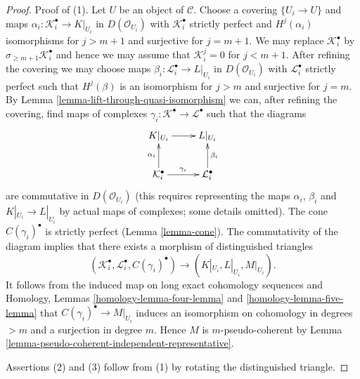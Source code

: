 \documentclass[10pt,a4paper]{amsart}
\theoremstyle{plain}
\theoremstyle{definition}
\theoremstyle{remark}
\numberwithin{equation}{subsection}
\begin{document}
\begin{proof}
Proof of (1). Let $U$ be an object of $\mathcal{C}$. Choose a covering
$\{U_i \to U\}$ and maps $\alpha_i : \mathcal{K}_i^\bullet \to K|_{U_i}$
in $D(\mathcal{O}_{U_i})$ with $\mathcal{K}_i^\bullet$ strictly perfect and
$H^j(\alpha_i)$ isomorphisms for $j > m + 1$ and surjective for $j = m + 1$.
We may replace $\mathcal{K}_i^\bullet$ by
$\sigma_{\geq m + 1}\mathcal{K}_i^\bullet$
and hence we may assume that $\mathcal{K}_i^j = 0$
for $j < m + 1$. After refining the covering we may choose
maps $\beta_i : \mathcal{L}_i^\bullet \to L|_{U_i}$ in $D(\mathcal{O}_{U_i})$
with $\mathcal{L}_i^\bullet$ strictly perfect such that
$H^j(\beta)$ is an isomorphism for $j > m$ and
surjective for $j = m$. By
Lemma \ref{lemma-lift-through-quasi-isomorphism}
we can, after refining the covering, find maps of complexes
$\gamma_i : \mathcal{K}^\bullet \to \mathcal{L}^\bullet$
such that the diagrams
$$
\xymatrix{
K|_{U_i} \ar[r] & L|_{U_i} \\
\mathcal{K}_i^\bullet \ar[u]^{\alpha_i} \ar[r]^{\gamma_i} &
\mathcal{L}_i^\bullet \ar[u]_{\beta_i}
}
$$
are commutative in $D(\mathcal{O}_{U_i})$ (this requires representing the
maps $\alpha_i$, $\beta_i$ and $K|_{U_i} \to L|_{U_i}$
by actual maps of complexes; some details omitted).
The cone $C(\gamma_i)^\bullet$ is strictly perfect (Lemma \ref{lemma-cone}).
The commutativity of the diagram implies that there exists a morphism
of distinguished triangles
$$
(\mathcal{K}_i^\bullet, \mathcal{L}_i^\bullet, C(\gamma_i)^\bullet)
\longrightarrow
(K|_{U_i}, L|_{U_i}, M|_{U_i}).
$$
It follows from the induced map on long exact cohomology sequences and
Homology, Lemmas \ref{homology-lemma-four-lemma} and
\ref{homology-lemma-five-lemma}
that $C(\gamma_i)^\bullet \to M|_{U_i}$ induces an isomorphism
on cohomology in degrees $> m$ and a surjection in degree $m$.
Hence $M$ is $m$-pseudo-coherent by
Lemma \ref{lemma-pseudo-coherent-independent-representative}.

\medskip\noindent
Assertions (2) and (3) follow from (1) by rotating the distinguished
triangle.
\end{proof}
\end{document}
